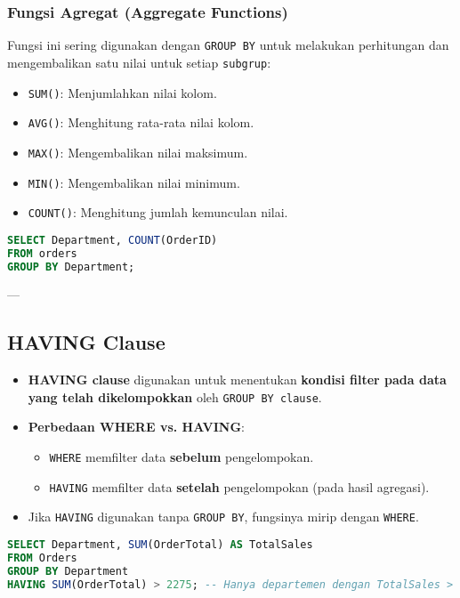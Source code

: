 \documentclass{article}
\begin{document}
\subsubsection{Fungsi Agregat (Aggregate Functions)}
Fungsi ini sering digunakan dengan \texttt{GROUP BY} untuk melakukan perhitungan dan mengembalikan satu nilai untuk setiap \texttt{subgrup}:
\begin{itemize}
    \item \texttt{SUM()}: Menjumlahkan nilai kolom.
    \item \texttt{AVG()}: Menghitung rata-rata nilai kolom.
    \item \texttt{MAX()}: Mengembalikan nilai maksimum.
    \item \texttt{MIN()}: Mengembalikan nilai minimum.
    \item \texttt{COUNT()}: Menghitung jumlah kemunculan nilai.
\end{itemize}

\begin{lstlisting}[language=SQL, caption={Contoh Penggunaan GROUP BY}, captionpos=b]
SELECT Department, COUNT(OrderID) 
FROM orders 
GROUP BY Department;
\end{lstlisting}

---

\subsection{HAVING Clause}
\begin{itemize}
    \item \textbf{HAVING clause} digunakan untuk menentukan \textbf{kondisi filter pada data yang telah dikelompokkan} oleh \texttt{GROUP BY clause}.
    \item \textbf{Perbedaan WHERE vs. HAVING}:
          \begin{itemize}
              \item \texttt{WHERE} memfilter data \textbf{sebelum} pengelompokan.
              \item \texttt{HAVING} memfilter data \textbf{setelah} pengelompokan (pada hasil agregasi).
          \end{itemize}
    \item Jika \texttt{HAVING} digunakan tanpa \texttt{GROUP BY}, fungsinya mirip dengan \texttt{WHERE}.
\end{itemize}

\begin{lstlisting}[language=SQL, caption={Contoh Penggunaan HAVING}, captionpos=b]
SELECT Department, SUM(OrderTotal) AS TotalSales
FROM Orders
GROUP BY Department
HAVING SUM(OrderTotal) > 2275; -- Hanya departemen dengan TotalSales > 2275
\end{lstlisting}
\end{document}
